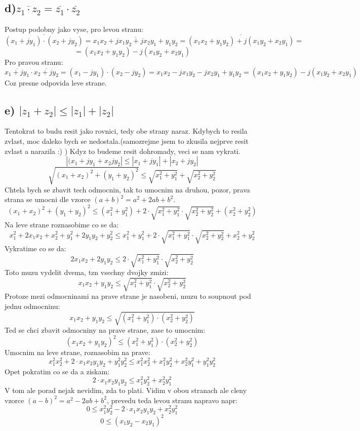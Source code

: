 \subsection*{d)$\overline{z_1\cdot z_2} = \overline{z_1}\cdot \overline{z_2}$}

Postup podobny jako vyse, pro levou stranu:
$$\overline{(x_1+jy_1)\cdot(x_2+jy_2)} = \overline{x_1 x_2 + jx_1 y_2 +jx_2 y_1+y_1 y_2} = \overline{(x_1 x_2 +y_1 y_2) + j (x_1 y_2+ x_2 y_1)} = $$ 
$$ = (x_1 x_2 +y_1 y_2) - j (x_1 y_2+ x_2 y_1)$$
Pro pravou stranu:
$$\overline{x_1+j y_1}\cdot \overline{x_2+j y_2} = (x_1 - jy_1)\cdot (x_2 - jy_2) = x_1 x_2 - jx_1 y_2 -jx_2 y_1+y_1 y_2= (x_1 x_2 +y_1 y_2) - j (x_1 y_2+ x_2 y_1)$$
Coz presne odpovida leve strane.

\subsection*{e) $|z_1+z_2| \leq |z_1| + |z_2|$}
Tentokrat to budu resit jako rovnici, tedy obe strany naraz. Kdybych to resila zvlast, moc daleko bych se nedostala.(samozrejme jsem to zkusila nejprve resit zvlast a narazila :) ) Kdyz to budeme resit dohromady, veci se nam vykrati.
$$|(x_1+jy_1 + x_2 jy_2| \leq |x_1+jy_1| + |x_2 + jy_2|$$
$$\sqrt{(x_1+x_2)^2+(y_1+y_2)^2} \leq \sqrt{x_1^2 +y_1^2}+\sqrt{x_2^2 + y_2^2}$$
Chtela bych se zbavit tech odmocnin, tak to umocnim na druhou, pozor, prava strana se umocni dle vzorce $(a+b)^2 = a^2+2ab+b^2$.
$$(x_1+x_2)^2+(y_1+y_2)^2 \leq (x_1^2 +y_1^2) + 2 \cdot \sqrt{x_1^2 +y_1^2} \cdot \sqrt{x_2^2 + y_2^2} + (x_2^2 + y_2^2)$$
Na leve strane roznasobime co se da:
$$x_1^2+2x_1 x_2 + x_2^2 + y_1^2 + 2y_1 y_2 + y_2^2 \leq x_1^2 +y_1^2 + 2 \cdot \sqrt{x_1^2 +y_1^2} \cdot \sqrt{x_2^2 + y_2^2} + x_2^2 + y_2^2$$
Vykratime co se da:
$$2 x_1 x_2 + 2 y_1 y_2 \leq 2 \cdot \sqrt{x_1^2 +y_1^2} \cdot \sqrt{x_2^2 + y_2^2} $$
Toto muzu vydelit dvema, tzn vsechny dvojky zmizi:
$$x_1 x_2 + y_1 y_2 \leq \sqrt{x_1^2 +y_1^2} \cdot \sqrt{x_2^2 + y_2^2} $$
Protoze mezi odmocninami na prave strane je nasobeni, muzu to soupnout pod jednu odmocninu:
$$x_1 x_2 + y_1 y_2 \leq \sqrt{(x_1^2 +y_1^2) \cdot (x_2^2 + y_2^2)} $$
Ted se chci zbavit odmocniny na prave strane, zase to umocnim:
$$(x_1 x_2 + y_1 y_2)^2 \leq (x_1^2 +y_1^2) \cdot (x_2^2 + y_2^2) $$
Umocnim na leve strane, roznasobim na prave:
$$x_1^2 x_2^2 + 2\cdot x_1 x_2 y_1 y_2 + y_1^2 y_2^2 \leq x_1^2 x_2^2 +x_1^2 y_2^2 + x_2^2 y_1^2 + y_1^2 y_2^2$$
Opet pokratim co se da a ziskam:
$$ 2\cdot x_1 x_2 y_1 y_2 \leq x_1^2 y_2^2 + x_2^2 y_1^2$$
V tom ale porad nejak nevidim, zda to plati. Vidim v obou stranach ale cleny vzorce $(a-b)^2 = a^2-2ab+b^2$, prevedu teda levou stranu napravo napr:
$$ 0 \leq x_1^2 y_2^2 -2\cdot x_1 x_2 y_1 y_2 + x_2^2 y_1^2$$
$$ 0 \leq (x_1 y_2 - x_2 y_1)^2$$

